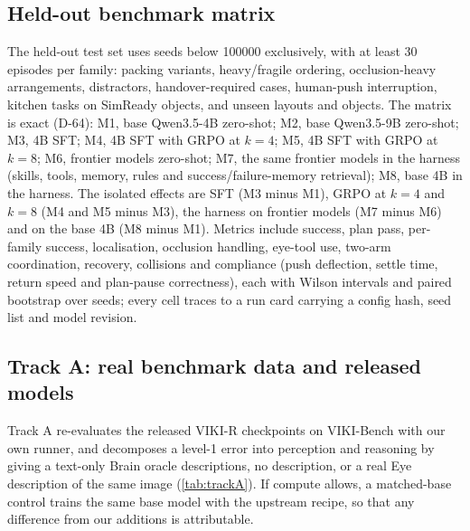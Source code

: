 \subsection{Held-out benchmark matrix}\label{sec:matrix}
The held-out test set uses seeds below 100000 exclusively, with at least 30 episodes per family: packing variants, heavy/fragile ordering, occlusion-heavy arrangements, distractors, handover-required cases, human-push interruption, kitchen tasks on SimReady objects, and unseen layouts and objects.
The matrix is exact (D-64): M1, base Qwen3.5-4B zero-shot; M2, base Qwen3.5-9B zero-shot; M3, 4B SFT; M4, 4B SFT with GRPO at $k=4$; M5, 4B SFT with GRPO at $k=8$; M6, frontier models zero-shot; M7, the same frontier models in the harness (skills, tools, memory, rules and success/failure-memory retrieval); M8, base 4B in the harness.
The isolated effects are SFT (M3 minus M1), GRPO at $k=4$ and $k=8$ (M4 and M5 minus M3), the harness on frontier models (M7 minus M6) and on the base 4B (M8 minus M1).
Metrics include success, plan pass, per-family success, localisation, occlusion handling, eye-tool use, two-arm coordination, recovery, collisions and compliance (push deflection, settle time, return speed and plan-pause correctness), each with Wilson intervals and paired bootstrap over seeds; every cell traces to a run card carrying a config hash, seed list and model revision.

\subsection{Track A: real benchmark data and released models}\label{sec:track-a}
Track A re-evaluates the released VIKI-R checkpoints on VIKI-Bench with our own runner, and decomposes a level-1 error into perception and reasoning by giving a text-only Brain oracle descriptions, no description, or a real Eye description of the same image (\cref{tab:trackA}).
If compute allows, a matched-base control trains the same base model with the upstream recipe, so that any difference from our additions is attributable.

\begin{table}[tbp]
\centering\small

\caption{Track A design. L1 and L2 are VIKI-Bench levels. All cells are pending.}
\label{tab:trackA}
\end{table}

